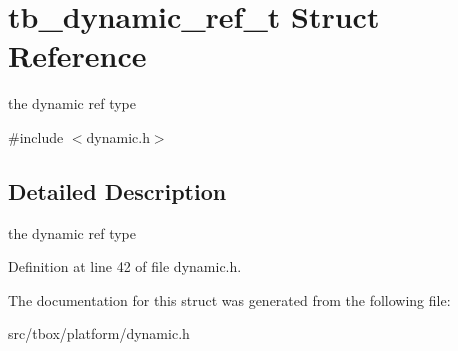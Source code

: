 \hypertarget{structtb__dynamic__ref__t}{\section{tb\-\_\-dynamic\-\_\-ref\-\_\-t Struct Reference}
\label{structtb__dynamic__ref__t}
}


the dynamic ref type  




{\ttfamily \#include $<$dynamic.\-h$>$}



\subsection{Detailed Description}
the dynamic ref type 

Definition at line 42 of file dynamic.\-h.



The documentation for this struct was generated from the following file\-:\begin{DoxyCompactItemize}
\item 
src/tbox/platform/dynamic.\-h\end{DoxyCompactItemize}
